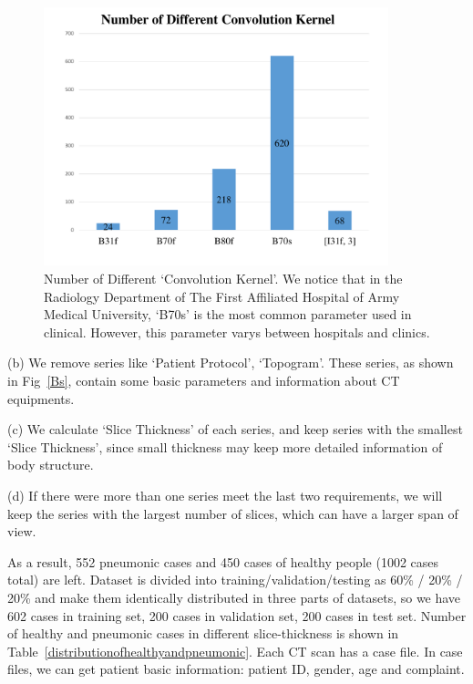 \documentclass[journal]{IEEEtran}
\begin{document}
\begin{figure}[t]
    \centerline{\includegraphics[width=100mm]{NumberofDifferentConvolutionKernel.pdf}}
    \vspace{-0cm}
    \caption{Number of Different `Convolution Kernel'. We notice that in the Radiology Department of The First Affiliated Hospital of Army Medical University, `B70s' is the most common parameter used in clinical. However, this parameter varys between hospitals and clinics.}
    \vspace{-0cm}
    \label{NumberofDifferentConvolutionKernel}
    \end{figure}

(b) We remove series like `Patient Protocol', `Topogram'. These series, as shown in Fig~\ref{Bs}, contain some basic parameters and information about CT equipments.

(c) We calculate `Slice Thickness' of each series, and keep series with the smallest `Slice Thickness', since small thickness may keep more detailed information of body structure. 

(d) If there were more than one series meet the last two requirements, we will keep the series with the largest number of slices, which can have a larger span of view.

As a result, 552 pneumonic cases and 450 cases of healthy people (1002 cases total) are left.
Dataset is divided into training/validation/testing as 60\% / 20\% / 20\% and make them identically distributed in three parts of datasets, so we have 602 cases in training set, 200 cases in validation set, 200 cases in test set.
Number of healthy and pneumonic cases in different slice-thickness is shown in Table~\ref{distributionofhealthyandpneumonic}.
Each CT scan has a case file. In case files, we can get patient basic information: patient ID, gender, age and complaint. 
\end{document}

